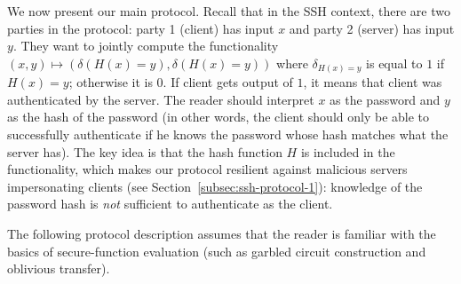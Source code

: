 We now present our main protocol.  Recall that in the SSH context,
there are two parties in the protocol: party 1 (client) has input $x$
and party 2 (server) has input $y$. They want to jointly compute
the functionality $(x,y) \longmapsto ( \delta (H(x) = y),\delta
(H(x) = y))$ where $\delta_{H(x) = y}$ is equal to $1$ if $H(x) =
y$; otherwise it is $0$. If client gets output of $1$, it means that
client was authenticated by the server. The reader should interpret $x$
as the password and $y$ as the hash of the password (in other words,
the client should only be able to successfully authenticate if he knows
the password whose hash matches what the server has).  The key idea is
that the hash function $H$ is included in the functionality, which makes
our protocol resilient against malicious servers impersonating clients
(see Section~\ref{subsec:ssh-protocol-1}): knowledge of the password hash
is \emph{not} sufficient to authenticate as the client.

The following protocol description assumes that the reader is familiar
with the basics of secure-function evaluation (such as garbled circuit
construction and oblivious transfer).

